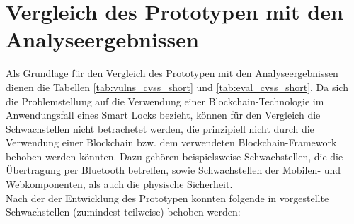 \section{Vergleich des Prototypen mit den Analyseergebnissen}
\label{sec:comparison}
    Als Grundlage für den Vergleich des Prototypen mit den Analyseergebnissen dienen die Tabellen \ref{tab:vulns_cvss_short} und \ref{tab:eval_cvss_short}.
    Da sich die Problemstellung auf die Verwendung einer Blockchain-Technologie im Anwendungsfall eines Smart Locks bezieht, können für den Vergleich die Schwachstellen nicht betrachetet werden, die prinzipiell nicht durch die Verwendung einer Blockchain bzw. dem verwendeten Blockchain-Framework behoben werden könnten. 
    Dazu gehören beispielsweise Schwachstellen, die die Übertragung per Bluetooth betreffen, sowie Schwachstellen der Mobilen- und Webkomponenten, als auch die physische Sicherheit. 
    \medskip\\
    Nach der der Entwicklung des Prototypen konnten folgende in  vorgestellte Schwachstellen (zumindest teilweise) behoben werden:
